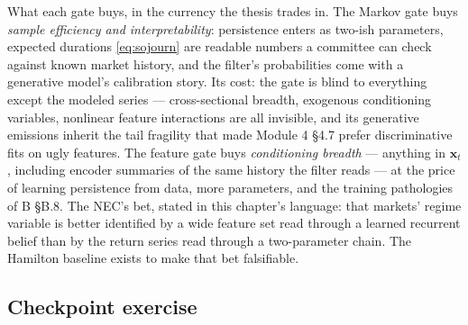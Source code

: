 \documentclass[11pt]{article}
\numberwithin{equation}{section}
\theoremstyle{plain}
\theoremstyle{definition}
\theoremstyle{remark}
\newcounter{exercise}
\newcommand{\x}{\bm{x}}
\begin{document}
\begin{finbox}
What each gate buys, in the currency the thesis trades in. The Markov gate buys \emph{sample efficiency and interpretability}: persistence enters as two-ish parameters, expected durations \eqref{eq:sojourn} are readable numbers a committee can check against known market history, and the filter's probabilities come with a generative model's calibration story. Its cost: the gate is blind to everything except the modeled series --- cross-sectional breadth, exogenous conditioning variables, nonlinear feature interactions are all invisible, and its generative emissions inherit the tail fragility that made Module 4 \S4.7 prefer discriminative fits on ugly features. The feature gate buys \emph{conditioning breadth} --- anything in $\x_t$, including encoder summaries of the same history the filter reads --- at the price of learning persistence from data, more parameters, and the training pathologies of B \S B.8. The NEC's bet, stated in this chapter's language: that markets' regime variable is better identified by a wide feature set read through a learned recurrent belief than by the return series read through a two-parameter chain. The Hamilton baseline exists to make that bet falsifiable.
\end{finbox}


\subsection*{Checkpoint exercise}
\end{document}
